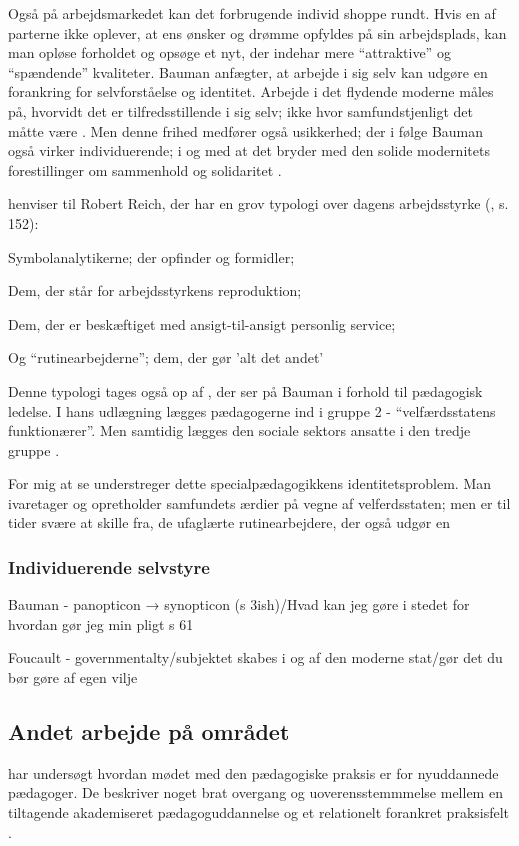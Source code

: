 Også på arbejdsmarkedet kan det forbrugende individ shoppe rundt.
Hvis en af parterne ikke oplever, at ens ønsker og drømme opfyldes på sin arbejdsplads, kan man opløse forholdet og opsøge et nyt, der indehar mere “attraktive” og “spændende” kvaliteter.
Bauman anfægter, at arbejde i sig selv kan udgøre en forankring for selvforståelse og identitet.
Arbejde i det flydende moderne måles på, hvorvidt det er tilfredsstillende i sig selv; ikke hvor samfundstjenligt det måtte være \autocite[s. 139; 163f]{baumanLiquidModernity2000}.
Men denne frihed medfører også usikkerhed; der i følge Bauman også virker individuerende; i og med at det bryder med den solide modernitets forestillinger om sammenhold og solidaritet \autocite[s. 148]{baumanLiquidModernity2000}.

\citeauthor{baumanLiquidModernity2000} henviser til Robert Reich, der har en grov typologi over dagens arbejdsstyrke (\citeyear{baumanLiquidModernity2000}, s. 152):

Symbolanalytikerne; der opfinder og formidler;

Dem, der står for arbejdsstyrkens reproduktion;

Dem, der er beskæftiget med ansigt-til-ansigt personlig service;

Og “rutinearbejderne”; dem, der gør 'alt det andet'

Denne typologi tages også op af \citeauthor{kofodOrganisationOgLedelse2016}, der ser på Bauman i forhold til pædagogisk ledelse.
I hans udlægning lægges pædagogerne ind i gruppe 2 - “velfærdsstatens funktionærer”.
Men samtidig lægges den sociale sektors ansatte i den tredje gruppe \autocite[s. 166]{kofodOrganisationOgLedelse2016}.

For mig at se understreger dette specialpædagogikkens identitetsproblem.
Man ivaretager og opretholder samfundets ærdier på vegne af velferdsstaten; men er til tider svære at skille fra, de ufaglærte rutinearbejdere, der også udgør en 


\subsubsection{Individuerende selvstyre}
Bauman - panopticon → synopticon (s 3ish)/Hvad kan jeg gøre i stedet for hvordan gør jeg min pligt s 61

Foucault - governmentalty/subjektet skabes i og af den moderne stat/gør det du bør gøre af egen vilje

\subsection{Andet arbejde på området}
\citeauthor{nielsenAttraktivPaPapiret2017} har undersøgt hvordan mødet med den pædagogiske praksis er for nyuddannede pædagoger. De beskriver noget brat overgang og uoverensstemmmelse mellem en tiltagende akademiseret pædagoguddannelse og et relationelt forankret praksisfelt \autocite{nielsenAttraktivPaPapiret2017}.

